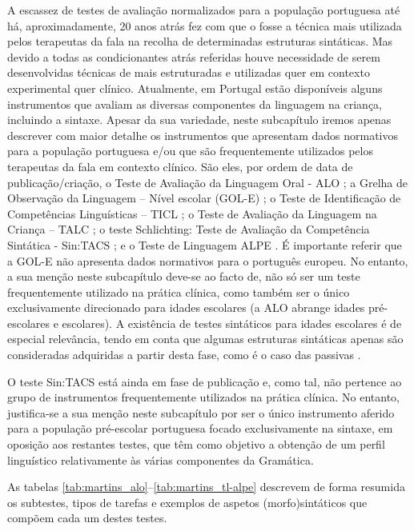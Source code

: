 \documentclass[output=paper]{LSP/langsci}
\begin{document}
A escassez de testes de avaliação normalizados para a população portuguesa até há, aproximadamente, 20 anos atrás fez com que o  fosse a técnica mais utilizada pelos terapeutas da fala na recolha de determinadas estruturas sintáticas. Mas devido a todas as condicionantes atrás referidas houve necessidade de serem desenvolvidas técnicas de  mais estruturadas e utilizadas quer em contexto experimental quer clínico. Atualmente, em Portugal estão disponíveis alguns instrumentos que avaliam as diversas componentes da linguagem na criança, incluindo a sintaxe. Apesar da sua variedade, neste subcapítulo iremos apenas descrever com maior detalhe os instrumentos que apresentam dados normativos para a população portuguesa e/ou que são frequentemente utilizados pelos terapeutas da fala em contexto clínico. São eles, por ordem de data de publicação/criação, o Teste de Avaliação da Linguagem Oral - ALO \citep{simsim1997}; a Grelha de Observação da Linguagem – Nível escolar (GOL-E) \citep{suakaysantos2003}; o Teste de Identificação de Competências Linguísticas – TICL \citep{viana2004}; o Teste de Avaliação da Linguagem na Criança – TALC \citep{suakaytavares2006}; o teste Schlichting: Teste de Avaliação da Competência Sintática - Sin:TACS \citep{vieir2011}; e o Teste de Linguagem ALPE \citep{mendes_etal2014}. É importante referir que a GOL-E não apresenta dados normativos para o português europeu. No entanto, a sua menção neste subcapítulo deve-se ao facto de, não só ser um teste frequentemente utilizado na prática clínica, como também ser o único exclusivamente direcionado para idades escolares (a ALO abrange idades pré-escolares e escolares). A existência de testes sintáticos para idades escolares é de especial relevância, tendo em conta que algumas estruturas sintáticas apenas são consideradas adquiridas a partir desta fase, como é o caso das passivas \citep{simsim1997}.

O teste Sin:TACS está ainda em fase de publicação e, como tal, não pertence ao grupo de instrumentos frequentemente utilizados na prática clínica. No entanto, justifica-se a sua menção neste subcapítulo por ser o único instrumento aferido para a população pré-escolar portuguesa focado exclusivamente na sintaxe, em oposição aos restantes testes, que têm como objetivo a obtenção de um perfil linguístico relativamente às várias componentes da Gramática.\largerpage[2]

As tabelas \ref{tab:martins_alo}--\ref{tab:martins_tl-alpe} descrevem de forma resumida os subtestes, tipos de tarefas e exemplos de aspetos (morfo)sintáticos que compõem cada um destes testes.\newpage
\end{document}
